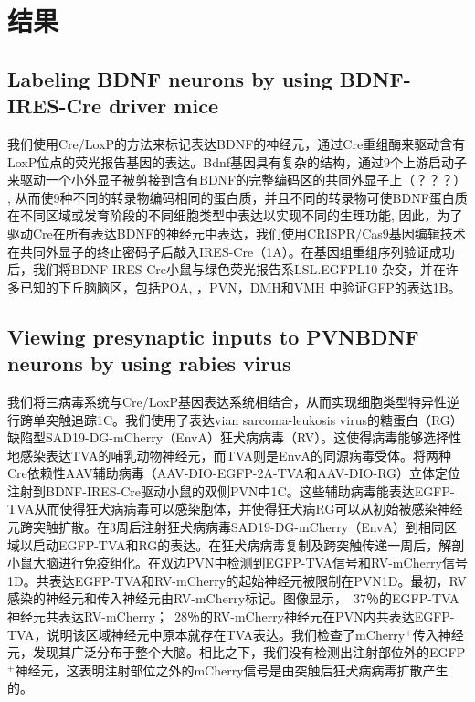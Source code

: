 \chapter{结果}\label{chap:results}

\section{Labeling BDNF neurons by using BDNF-IRES-Cre driver mice}
我们使用Cre/LoxP的方法来标记表达BDNF的神经元，通过Cre重组酶来驱动含有LoxP位点的荧光报告基因的表达。Bdnf基因具有复杂的结构，通过9个上游启动子来驱动一个小外显子被剪接到含有BDNF的完整编码区的共同外显子上（？？？） \cite{timmusk1993multiple}, \cite{altieri2004expression}从而使9种不同的转录物编码相同的蛋白质，并且不同的转录物可使BDNF蛋白质在不同区域或发育阶段的不同细胞类型中表达以实现不同的生理功能\citep{sakata2009critical}, \cite{maynard2016functional}因此，为了驱动Cre在所有表达BDNF的神经元中表达，我们使用CRISPR/Cas9基因编辑技术在共同外显子的终止密码子后敲入IRES-Cre（\figurename{1A}）。在基因组重组序列验证成功后，我们将BDNF-IRES-Cre小鼠与绿色荧光报告系LSL.EGFPL10 \cite{stanley2013profiling}杂交，并在许多已知的下丘脑脑区，包括POA\citep{tan2016warm}, \cite{zhao2017hypothalamic}，PVN\citep{an2015discrete}，DMH和VMH\citep{unger2007selective,wang2010brain} 中验证GFP的表达\figurename{1B}。

\section{Viewing presynaptic inputs to PVNBDNF neurons by using rabies virus}
我们将三病毒系统与Cre/LoxP基因表达系统\citep{wickersham2007monosynaptic}相结合，从而实现细胞类型特异性逆行跨单突触追踪\figurename{1C}。我们使用了表达vian sarcoma-leukosis virus的糖蛋白（RG）缺陷型SAD19-DG-mCherry（EnvA）狂犬病病毒（RV）。这使得病毒能够选择性地感染表达TVA的哺乳动物神经元，而TVA则是EnvA的同源病毒受体。将两种Cre依赖性AAV辅助病毒（AAV-DIO-EGFP-2A-TVA和AAV-DIO-RG）立体定位注射到BDNF-IRES-Cre驱动小鼠的双侧PVN中\figurename{1C}。这些辅助病毒能表达EGFP-TVA从而使得狂犬病病毒可以感染胞体，并使得狂犬病RG可以从初始被感染神经元跨突触扩散。在3周后注射狂犬病病毒SAD19-DG-mCherry（EnvA）到相同区域以启动EGFP-TVA和RG的表达。在狂犬病病毒复制及跨突触传递一周后，解剖小鼠大脑进行免疫组化。在双边PVN中检测到EGFP-TVA信号和RV-mCherry信号\figurename{1D}。共表达EGFP-TVA和RV-mCherry的起始神经元被限制在PVN\figurename{1D}。最初，RV感染的神经元和传入神经元由RV-mCherry标记。图像显示，~37％的EGFP-TVA神经元共表达RV-mCherry；~28％的RV-mCherry神经元在PVN内共表达EGFP-TVA，说明该区域神经元中原本就存在TVA表达。\label{1D}我们检查了mCherry$^{+}$传入神经元，发现其广泛分布于整个大脑。相比之下，我们没有检测出注射部位外的EGFP$^{+}$神经元，这表明注射部位之外的mCherry信号是由突触后狂犬病病毒扩散产生的。

